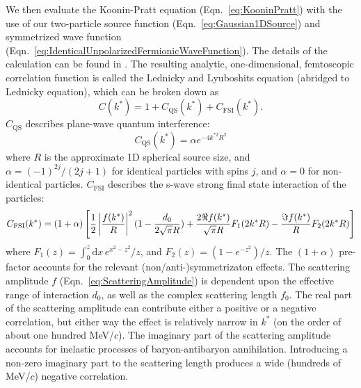 We then evaluate the Koonin-Pratt equation (Eqn.\ \ref{eq:KooninPratt}) with the use of our two-particle source function (Eqn.\ \ref{eq:Gaussian1DSource}) and symmetrized wave function (Eqn.\ \ref{eq:IdenticalUnpolarizedFermionicWaveFunction}).
The details of the calculation can be found in \cite{lednicky82}.
The resulting analytic, one-dimensional, femtoscopic correlation function is called the Lednicky and Lyuboshits equation (abridged to Lednicky equation), which can be broken down as
\begin{equation}
\label{eq:GeneralCorrelationFunction}
C(k^*)= 1 + C_{\mathrm{QS}}(k^*)+C_{\mathrm{FSI}}(k^*).
\end{equation}
$C_{\mathrm{QS}}$ describes plane-wave quantum interference:
\begin{equation}
C_{\mathrm{QS}}(k^*) = \alpha e^{-4k^{*2}R^2}
\end{equation}
where $R$ is the approximate 1D spherical source size, and $\alpha = (-1)^{2j}/(2j+1)$ for identical particles with spins $j$, and $\alpha = 0$ for non-identical particles.
$C_{\mathrm{FSI}}$ describes the s-wave strong final state interaction of the particles:
\begin{equation}
\label{eq:Lednicky}
C_{\mathrm{FSI}}(k^*)= (1+\alpha)\left[\frac{1}{2}\left\lvert\frac{f(k^*)}{R}\right\rvert^2(1-\frac{d_0}{2\sqrt{\pi}R})+\frac{2\Re f(k^*)}{\sqrt{\pi}R}F_1(2k^*R)-\frac{\Im f(k^*)}{R}F_2(2k^*R)\right]
\end{equation}
where $F_1(z) = \int_0^z \! \mathrm{d}x \, e^{x^2-z^2}/z$, and $F_2(z) = (1-e^{-z^2})/z$.
The $(1+\alpha)$ pre-factor accounts for the relevant (non/anti-)symmetrizaton effects.
The scattering amplitude $f$ (Eqn.\ \ref{eq:ScatteringAmplitude}) is dependent upon the effective range of interaction $d_0$, as well as the complex scattering length $f_0$.  
The real part of the scattering amplitude can contribute either a positive or a negative correlation, but either way the effect is relatively narrow in $k^*$ (on the order of about one hundred MeV/$c$).  
The imaginary part of the scattering amplitude accounts for inelastic processes of baryon-antibaryon annihilation.  
Introducing a non-zero imaginary part to the scattering length produces a wide (hundreds of MeV/$c$) negative correlation.  

